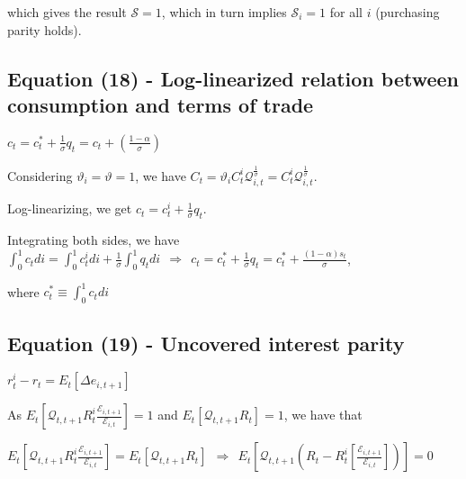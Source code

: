 \documentclass[
]{article}
\begin{document}
which gives the result \(\mathcal{S}=1\), which in turn implies
\(\mathcal{S}_i=1\) for all \(i\) (purchasing parity holds).

\vspace{12pt}

\hypertarget{equation-18---log-linearized-relation-between-consumption-and-terms-of-trade}{%
\subsection{Equation (18) - Log-linearized relation between consumption
and terms of
trade}\label{equation-18---log-linearized-relation-between-consumption-and-terms-of-trade}}

\(\displaystyle c_t=c_t^*+\frac{1}{\sigma}q_t = c_t+\left( \frac{1-\alpha}{\sigma} \right)\)

\vspace{8pt}

Considering \(\vartheta_i=\vartheta=1\), we have
\(C_t=\vartheta_i C_t^i \mathcal{Q}_{i,t}^{\frac{1}{\sigma}}= C_t^i \mathcal{Q}_{i,t}^{\frac{1}{\sigma}}\).

Log-linearizing, we get \(\displaystyle c_t=c_t^i+\frac{1}{\sigma}q_t\).

Integrating both sides, we have
\(\displaystyle \int_0^1 c_t di = \int_0^1c_t^i di + \frac{1}{\sigma} \int_0^1q_t di \ \ \Rightarrow \ \ c_t=c_t^*+ \frac{1}{\sigma}q_t=c_t^*+ \frac{(1-\alpha)s_t}{\sigma}\),

where \(c_t^* \equiv \int_0^1 c_t di\)

\vspace{12pt}

\hypertarget{equation-19---uncovered-interest-parity}{%
\subsection{Equation (19) - Uncovered interest
parity}\label{equation-19---uncovered-interest-parity}}

\(r_t^i-r_t=E_t[\Delta e_{i,t+1}]\)

\vspace{8pt}

As
\(\displaystyle E_t\left[ \mathcal{Q}_{t,t+1} R_t^i \frac{\mathcal{E}_{i,t+1} }{\mathcal{E}_{i,t} }\right] = 1\)
and \(\displaystyle E_t\left[ \mathcal{Q}_{t,t+1} R_t \right] = 1\), we
have that

\(\displaystyle E_t\left[ \mathcal{Q}_{t,t+1} R_t^i \frac{\mathcal{E}_{i,t+1} }{\mathcal{E}_{i,t} }\right] = \displaystyle E_t\left[ \mathcal{Q}_{t,t+1} R_t \right] \ \ \Rightarrow \ \  E_t\left[ \mathcal{Q}_{t,t+1} \left(R_t-R_t^i \left[ \frac{\mathcal{E}_{i,t+1} }{\mathcal{E}_{i,t} } \right] \right) \right] = 0\)
\end{document}
